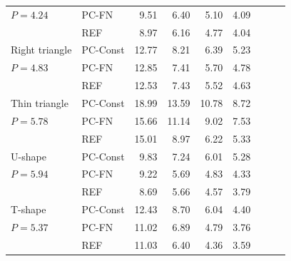 \begin{table}[htbp]
\begin{tabular}{llrrrrrrr}
$P = 4.24$ & PC-FN & 9.51 & 6.40 & 5.10 & 4.09 &  &  &  \\
 & REF & 8.97 & 6.16 & 4.77 & 4.04 &  &  &  \\
\addlinespace[2pt]
Right triangle & PC-Const & 12.77 & 8.21 & 6.39 & 5.23 &  &  &  \\
$P = 4.83$ & PC-FN & 12.85 & 7.41 & 5.70 & 4.78 &  &  &  \\
 & REF & 12.53 & 7.43 & 5.52 & 4.63 &  &  &  \\
\addlinespace[2pt]
Thin triangle & PC-Const & 18.99 & 13.59 & 10.78 & 8.72 &  &  &  \\
$P = 5.78$ & PC-FN & 15.66 & 11.14 & 9.02 & 7.53 &  &  &  \\
 & REF & 15.01 & 8.97 & 6.22 & 5.33 &  &  &  \\
\addlinespace[2pt]
U-shape & PC-Const & 9.83 & 7.24 & 6.01 & 5.28 &  &  &  \\
$P = 5.94$ & PC-FN & 9.22 & 5.69 & 4.83 & 4.33 &  &  &  \\
 & REF & 8.69 & 5.66 & 4.57 & 3.79 &  &  &  \\
\addlinespace[2pt]
T-shape & PC-Const & 12.43 & 8.70 & 6.04 & 4.40 &  &  &  \\
$P = 5.37$ & PC-FN & 11.02 & 6.89 & 4.79 & 3.76 &  &  &  \\
 & REF & 11.03 & 6.40 & 4.36 & 3.59 &  &  &  \\
\bottomrule
\end{tabular}
\end{table}
